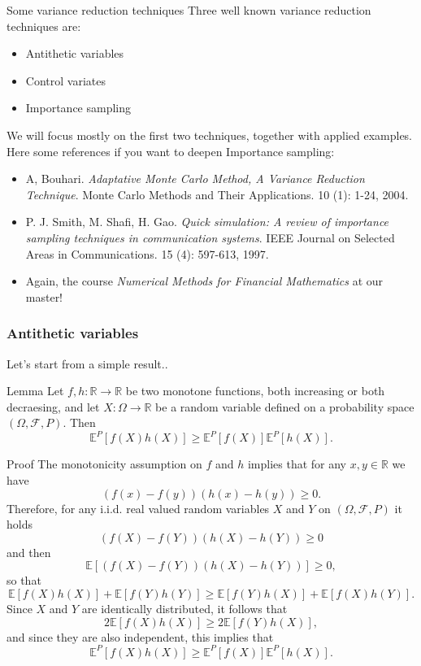 \documentclass[9 pt]{beamer} %
\def \F {\mathcal{F}}
\def \bE {\mathbb{E}}
\begin{document}
\begin{frame}{Some variance reduction techniques}
Three well known variance reduction techniques are:
\begin{itemize}
\item Antithetic variables
 \item Control variates
 \item Importance sampling
 \end{itemize}
 We will focus mostly on the first two techniques, together with applied examples. Here some references if you want to deepen Importance sampling:
 \begin{itemize}
\item A, Bouhari. \emph{Adaptative Monte Carlo Method, A Variance Reduction Technique}. Monte Carlo Methods and Their Applications. 10 (1): 1-24, 2004.
 \item P. J. Smith, M. Shafi, H. Gao. \emph{Quick simulation: A review of importance sampling techniques in communication systems}. IEEE Journal on Selected Areas in Communications. 15 (4): 597-613, 1997.
 \item Again, the course \emph{Numerical Methods for Financial Mathematics} at our master!
 \end{itemize}
\end{frame}


\subsubsection{Antithetic variables}
\frame{  \tableofcontents[
    sectionstyle=show/shaded,
    subsectionstyle=show/shaded/shaded,
    subsubsectionstyle=show/shaded/shaded/shaded
    ]}


\begin{frame}{Let's start from a simple result..}
\small{\begin{block}{Lemma}
Let $f, h: \mathbb{R} \to \mathbb{R}$ be two monotone functions, both increasing or both decraesing, and let $X: \Omega \to \mathbb{R}$ be a random variable defined on a probability space $(\Omega, \F, P)$.
Then
$$
\bE^P[f(X)h(X)] \ge \bE^P[f(X)]\bE^P[h(X)].
$$
\end{block}
\begin{block}{Proof}
The monotonicity assumption on $f$ and $h$ implies that for any $x,y \in \mathbb{R}$ we have
$$
\left(f(x)-f(y)\right)\left(h(x)-h(y)\right) \ge 0.
$$
Therefore, for any i.i.d. real valued random variables $X$ and $Y$ on $(\Omega, \F, P)$ it holds
$$
\left(f(X)-f(Y)\right)\left(h(X)-h(Y)\right)  \ge 0
$$
and then
$$
\bE \left[\left(f(X)-f(Y)\right)\left(h(X)-h(Y)\right)\right]  \ge 0,
$$
so that
$$
\bE \left[f(X)h(X)\right]+\bE \left[f(Y)h(Y)\right] \ge \bE \left[f(Y)h(X)\right]+\bE \left[f(X)h(Y)\right].
$$
Since $X$ and $Y$ are identically distributed, it follows that
$$
2\bE \left[f(X)h(X)\right]\ge 2 \bE \left[f(Y)h(X)\right],
$$
and since they are also independent, this implies that
$$
\bE^P[f(X)h(X)] \ge \bE^P[f(X)]\bE^P[h(X)].
$$
\end{block}}
\end{frame}
\end{document}
